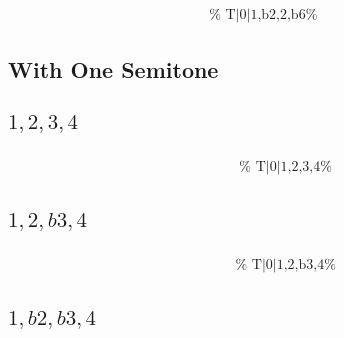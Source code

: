 \documentclass[english]{./gbook}
\begin{document}
\begin{large}
\[\begin{array}{ll}
&
	\text{
	}
\end{array}
\]


\subsection*{With One Semitone}


\subsection*{$1,2,3,4$}
\[
\begin{array}{ll}
	\begin{array}{c}
		\begin{array}{ccc}
			&%
			&%
		\end{array}
		\\
		\begin{array}{cc}
			&%
		\end{array}
	\end{array}

&
	\text{
	}
\end{array}
\]

\subsection*{$1,2,b3,4$}
\[
\begin{array}{ll}
	\begin{array}{c}
		\begin{array}{ccc}
			&%
			&%
		\end{array}
		\\
		\begin{array}{cc}
			&%
		\end{array}
	\end{array}

&
	\text{
	}
\end{array}
\]

\subsection*{$1,b2,b3,4$}
\[
\begin{array}{ll}
	\begin{array}{c}
		\begin{array}{ccc}
			&%
			&%
		\end{array}
		\\
		\begin{array}{cc}
			&%
		\end{array}
	\end{array}


\end{array}\]
\end{large}
\end{document}
